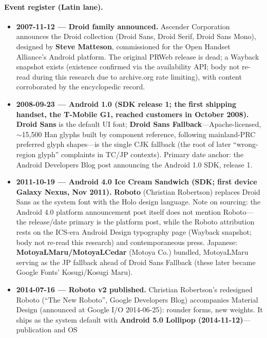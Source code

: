 \documentclass[10pt,a4paper]{article}
\begin{document}
\paragraph{Event register (Latin lane).}
\begin{itemize}[leftmargin=1.2em,itemsep=2pt]
\item \textbf{2007-11-12 --- Droid family announced.} Ascender Corporation announces
the Droid collection (Droid Sans, Droid Serif, Droid Sans Mono), designed by
\textbf{Steve Matteson}, commissioned for the Open Handset Alliance's Android platform.
The original PRWeb release is dead; a Wayback snapshot exists (existence confirmed via
the availability API; body not re-read during this research due to archive.org rate
limiting), with content corroborated by the encyclopedic record.\cite{a-droid-pr,a-droid}
\item \textbf{2008-09-23 --- Android 1.0 (SDK release 1; the first shipping handset, the
T-Mobile G1, reached customers in October 2008).} \textbf{Droid Sans} is the default UI font;
\textbf{Droid Sans Fallback}---Apache-licensed, $\sim$15,500 Han glyphs built by
component reference, following mainland-PRC preferred glyph shapes---is the single CJK
fallback (the root of later ``wrong-region glyph'' complaints in TC/JP contexts).
Primary date anchor: the Android Developers Blog post announcing the Android 1.0 SDK,
release 1.\cite{a-10sdk,a-droid,a-fallback}
\item \textbf{2011-10-19 --- Android 4.0 Ice Cream Sandwich (SDK; first device Galaxy
Nexus, Nov 2011).} \textbf{Roboto} (Christian Robertson) replaces Droid Sans as the
system font with the Holo design language. Note on sourcing: the Android 4.0 platform
announcement post itself does not mention Roboto---the release/date primary is the
platform post, while the Roboto attribution rests on the ICS-era Android Design
typography page (Wayback snapshot; body not re-read this research) and contemporaneous
press. Japanese: \textbf{MotoyaLMaru/MotoyaLCedar} (Motoya Co.) bundled, MotoyaLMaru
serving as the JP fallback ahead of Droid Sans Fallback (these later became Google
Fonts' Kosugi/Kosugi Maru).\cite{a-ics-sdk,a-ics-typo,a-wired,a-motoya,a-motoya-2}
\item \textbf{2014-07-16 --- Roboto v2 published.} Christian Robertson's redesigned
Roboto (``The New Roboto'', Google Developers Blog) accompanies Material Design
(announced at Google I/O 2014-06-25): rounder forms, new weights. It ships as the
system default with \textbf{Android 5.0 Lollipop (2014-11-12)}---publication and OS

\end{itemize}
\end{document}
